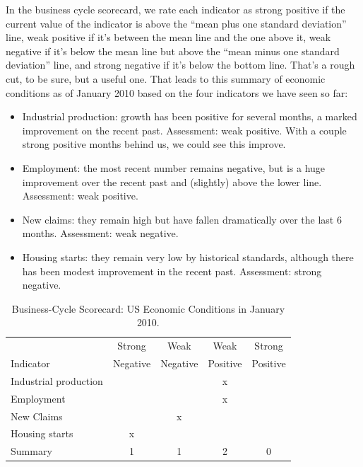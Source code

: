 \documentclass[letterpaper,12pt]{article}
\begin{document}
In the business cycle scorecard,
we rate each indicator as strong positive if
the current value of the indicator is above the
``mean plus one standard deviation'' line,
weak positive if it's between the mean line and the one above it,
weak negative if it's below the mean line but above
the ``mean minus one standard deviation'' line,
and strong negative if it's below the bottom line.
That's a rough cut, to be sure, but a useful one.
That leads to this summary of economic conditions as of January 2010
based on the four indicators we have seen so far:
\begin{itemize}
\item Industrial production:  growth has been positive for
several months, a marked improvement on the recent past.
Assessment:  weak positive.  With a couple strong positive
months behind us, we could see this improve.
\item Employment:  the most recent number remains negative,
but is a huge improvement over the recent past and (slightly)
above the lower line.
Assessment:  weak positive.
\item New claims:  they remain high but have fallen dramatically
over the last 6 months.
Assessment:  weak negative.
\item Housing starts:  they remain very low by historical standards,
although there has been modest improvement in the recent past.
Assessment:  strong negative.
\end{itemize}


\begin{table}[h!]
\begin{center}
\begin{tabular}{lcccc}
\toprule
            &  Strong    &  Weak  &  Weak   &  Strong  \\
Indicator   &  Negative  & Negative & Positive & Positive \\
\midrule
Industrial production  &&& x \\
Employment             &&& x \\
New Claims             && x \\
Housing starts         & x &  \\
\midrule
Summary                & 1 & 1 & 2 & 0 \\
\bottomrule
\end{tabular}
\caption{Business-Cycle Scorecard:  US Economic Conditions in January 2010.}
\label{tab:scorecard}
\end{center}
\end{table}
\end{document}
